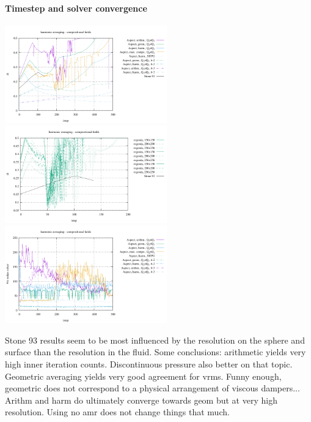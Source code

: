 \paragraph{Timestep and solver convergence}
\begin{center}
\includegraphics[width=7cm]{images/stokes_sphere_fs2D/dt_aspect}
\includegraphics[width=7cm]{images/stokes_sphere_fs2D/dt_pic}
\includegraphics[width=7cm]{images/stokes_sphere_fs2D/stokes_solver}
\end{center}

Stone 93 results seem to be most influenced by the resolution on the sphere and 
surface than the resolution in the fluid.
Some conclusions: arithmetic yields very high inner iteration counts. Discontinuous pressure
also better on that topic. Geometric averaging yields very good agreement for vrms.
Funny enough, geometric does not correspond to a physical arrangement of viscous dampers...
Arithm and harm do ultimately converge towards geom but at very high resolution.
Using no amr does not change things that much.  


